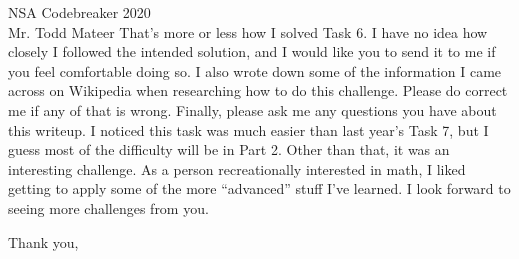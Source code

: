\documentclass{letter}
\begin{document}
\begin{letter}{NSA Codebreaker 2020\\Mr. Todd Mateer}
That's more or less how I solved Task 6. I have no idea how closely I followed
the intended solution, and I would like you to send it to me if you feel
comfortable doing so. I also wrote down some of the information I came across on
Wikipedia when researching how to do this challenge. Please do correct me if any
of that is wrong. Finally, please ask me any questions you have about this
writeup. I noticed this task was much easier than last year's Task 7, but I
guess most of the difficulty will be in Part 2. Other than that, it was an
interesting challenge. As a person recreationally interested in math, I liked
getting to apply some of the more ``advanced'' stuff I've learned. I look
forward to seeing more challenges from you.


\closing{Thank you,}
\end{letter}
\end{document}
